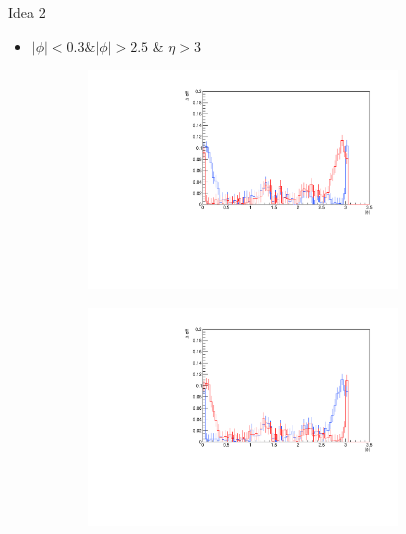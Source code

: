 \documentclass[11pt]{beamer}
\begin{document}
\begin{frame}{Idea 2}
\begin{itemize}
\item $|\phi| < 0.3 \& |\phi| > 2.5$ \& $\eta > 3$
\end{itemize}
\begin{figure}
\begin{subfigure}{0.45\textwidth}
\includegraphics[width=0.9\textwidth]{first/up_pdf/test_u/h_phi_test_SPi_combined.pdf}
\end{subfigure}
\begin{subfigure}{0.45\textwidth}
\includegraphics[width=0.9\textwidth]{first/down_pdf/test_d/h_phi_test_SPi_combined.pdf}
\end{subfigure}
\end{figure}
\end{frame}
\end{document}
